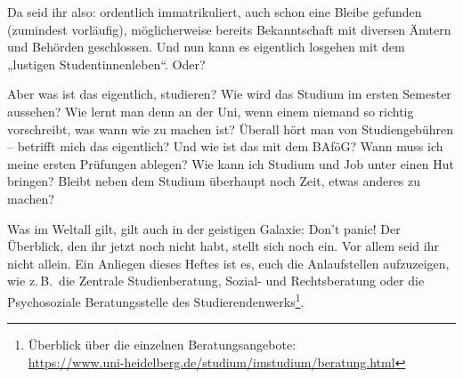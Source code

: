 \label{dschungel}
Da seid ihr also: ordentlich immatrikuliert, auch schon eine Bleibe gefunden (zumindest vorläufig), möglicherweise bereits Bekanntschaft mit diversen Ämtern und Behörden geschlossen. Und nun kann es eigentlich losgehen mit dem „lustigen Studentinnenleben“. Oder?

Aber was ist das eigentlich, studieren? Wie wird das Studium im ersten Semester aussehen? Wie lernt man denn an der Uni, wenn einem niemand so richtig vorschreibt, was wann wie zu machen ist? Überall hört man von Studiengebühren -- betrifft mich das eigentlich? Und wie ist das mit dem BAföG? Wann muss ich meine ersten Prüfungen ablegen? Wie kann ich Studium und Job unter einen Hut bringen? Bleibt neben dem Studium überhaupt noch Zeit, etwas anderes zu machen?

Was im Weltall gilt, gilt auch in der geistigen Galaxie: Don't panic! Der Überblick, den ihr jetzt noch nicht habt, stellt sich noch ein. Vor allem seid ihr nicht allein. Ein Anliegen dieses Heftes ist es, euch die Anlaufstellen aufzuzeigen, wie z.\,B.\ die Zentrale Studienberatung, Sozial- und Rechtsberatung oder die Psychosoziale Beratungsstelle des Studierendenwerks\footnote{Überblick über die einzelnen Beratungsangebote:\\\url{https://www.uni-heidelberg.de/studium/imstudium/beratung.html}}.


